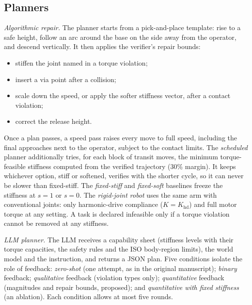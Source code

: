 \documentclass[journal]{IEEEtran}
\begin{document}
\subsection{Planners}
\emph{Algorithmic repair.} The planner starts from a pick-and-place template: rise to a safe height, follow an arc around the base on the side away from the operator, and descend vertically. It then applies the verifier's repair bounds:
\begin{itemize}
\item stiffen the joint named in a torque violation;
\item insert a via point after a collision;
\item scale down the speed, or apply the softer stiffness vector, after a contact violation;
\item correct the release height.
\end{itemize}
Once a plan passes, a speed pass raises every move to full speed, including the final approaches next to the operator, subject to the contact limits. The \emph{scheduled} planner additionally tries, for each block of transit moves, the minimum torque-feasible stiffness computed from the verified trajectory (30\% margin). It keeps whichever option, stiff or softened, verifies with the shorter cycle, so it can never be slower than fixed-stiff. The \emph{fixed-stiff} and \emph{fixed-soft} baselines freeze the stiffness at $s=1$ or $s=0$. The \emph{rigid-joint robot} uses the same arm with conventional joints: only harmonic-drive compliance ($K=K_\mathrm{hd}$) and full motor torque at any setting. A task is declared infeasible only if a torque violation cannot be removed at any stiffness.

\emph{LLM planner.} The LLM receives a capability sheet (stiffness levels with their torque capacities, the safety rules and the ISO body-region limits), the world model and the instruction, and returns a JSON plan. Five conditions isolate the role of feedback: \emph{zero-shot} (one attempt, as in the original manuscript); \emph{binary} feedback; \emph{qualitative} feedback (violation types only); \emph{quantitative} feedback (magnitudes and repair bounds, proposed); and \emph{quantitative with fixed stiffness} (an ablation). Each condition allows at most five rounds.

\end{document}
